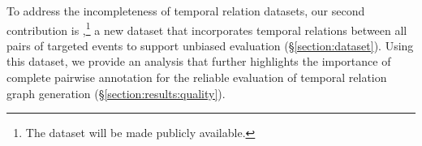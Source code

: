 To address the incompleteness of temporal relation datasets, our second contribution is \textit{\App{}},\footnote{The \App{} dataset will be made publicly available.} a new dataset that incorporates temporal relations between all pairs of targeted events to support unbiased evaluation (§\ref{section:dataset}). Using this dataset, we provide an analysis that further highlights the importance of complete pairwise annotation for the reliable evaluation of temporal relation graph generation (§\ref{section:results:quality}).

